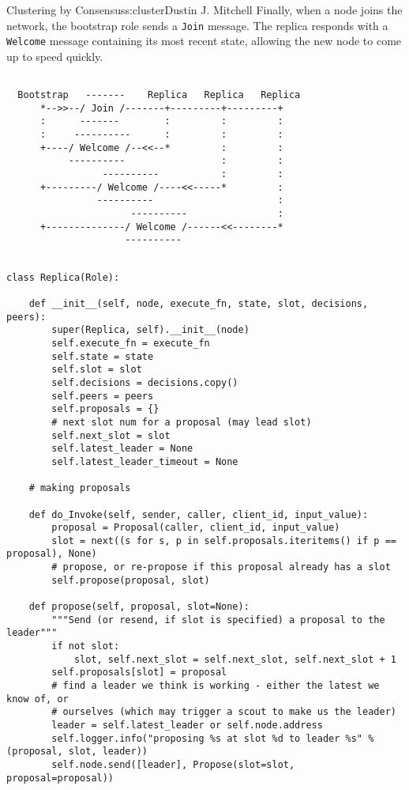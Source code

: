 \begin{aosachapter}{Clustering by Consensus}{s:cluster}{Dustin J. Mitchell}
Finally, when a node joins the network, the bootstrap role sends a
\texttt{Join} message. The replica responds with a \texttt{Welcome}
message containing its most recent state, allowing the new node to come
up to speed quickly.

\begin{verbatim}

  Bootstrap   -------    Replica   Replica   Replica
      *-->>--/ Join /-------+---------+---------+
      :      -------        :         :         :
      :     ----------      :         :         :
      +----/ Welcome /--<<--*         :         :
           ----------                 :         :
                 ----------           :         :
      +---------/ Welcome /----<<-----*         :
                ----------                      :
                      ----------                :
      +--------------/ Welcome /------<<--------*
                     ----------
\end{verbatim}

\begin{verbatim}

class Replica(Role):

    def __init__(self, node, execute_fn, state, slot, decisions, peers):
        super(Replica, self).__init__(node)
        self.execute_fn = execute_fn
        self.state = state
        self.slot = slot
        self.decisions = decisions.copy()
        self.peers = peers
        self.proposals = {}
        # next slot num for a proposal (may lead slot)
        self.next_slot = slot
        self.latest_leader = None
        self.latest_leader_timeout = None

    # making proposals

    def do_Invoke(self, sender, caller, client_id, input_value):
        proposal = Proposal(caller, client_id, input_value)
        slot = next((s for s, p in self.proposals.iteritems() if p == proposal), None)
        # propose, or re-propose if this proposal already has a slot
        self.propose(proposal, slot)

    def propose(self, proposal, slot=None):
        """Send (or resend, if slot is specified) a proposal to the leader"""
        if not slot:
            slot, self.next_slot = self.next_slot, self.next_slot + 1
        self.proposals[slot] = proposal
        # find a leader we think is working - either the latest we know of, or
        # ourselves (which may trigger a scout to make us the leader)
        leader = self.latest_leader or self.node.address
        self.logger.info("proposing %s at slot %d to leader %s" % (proposal, slot, leader))
        self.node.send([leader], Propose(slot=slot, proposal=proposal))


\end{verbatim}
\end{aosachapter}
